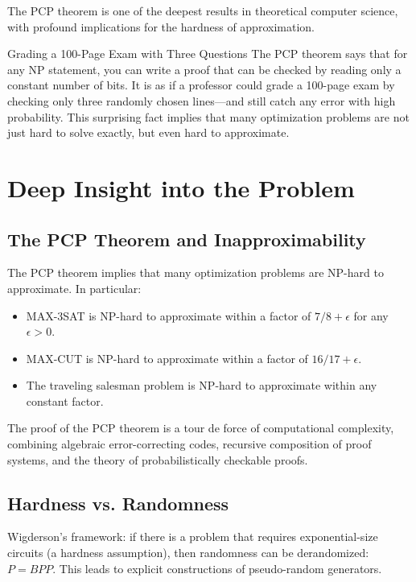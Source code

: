The PCP theorem is one of the deepest results in theoretical computer science, with profound implications for the hardness of approximation.

\begin{analogy}{Grading a 100-Page Exam with Three Questions}
The PCP theorem says that for any NP statement, you can write a proof that can be checked by reading only a constant number of bits. It is as if a professor could grade a 100-page exam by checking only three randomly chosen lines---and still catch any error with high probability. This surprising fact implies that many optimization problems are not just hard to solve exactly, but even hard to approximate.
\end{analogy}

\section{Deep Insight into the Problem}

\subsection{The PCP Theorem and Inapproximability}

The PCP theorem implies that many optimization problems are NP-hard to approximate. In particular:
\begin{itemize}
\item MAX-3SAT is NP-hard to approximate within a factor of $7/8 + \epsilon$ for any $\epsilon > 0$.
\item MAX-CUT is NP-hard to approximate within a factor of $16/17 + \epsilon$.
\item The traveling salesman problem is NP-hard to approximate within any constant factor.
\end{itemize}

The proof of the PCP theorem is a tour de force of computational complexity, combining algebraic error-correcting codes, recursive composition of proof systems, and the theory of probabilistically checkable proofs.

\subsection{Hardness vs. Randomness}

Wigderson's framework: if there is a problem that requires exponential-size circuits (a hardness assumption), then randomness can be derandomized: $P = BPP$. This leads to explicit constructions of pseudo-random generators.

